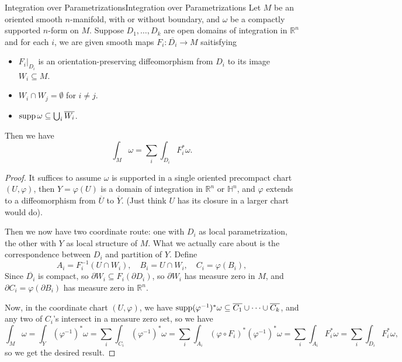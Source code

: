 \documentclass[../main.tex]{subfiles}
\begin{document}
\begin{proposition}{Integration over Parametrizations}{Integration over Parametrizations}
  Let $M$ be an oriented smooth $n$-manifold, with or without boundary, and $\omega$ be a compactly supported $n$-form on $M$. Suppose $D_1, \ldots ,D_k$ are open domains of integration in $\mathbb{R}^n$ and for each $i$, we are given smooth maps $F_i: \overline{D_i} \to M$ saitisfying
  \begin{itemize}
    \item $F_i|_{D_i}$ is an orientation-preserving diffeomorphism from $D_i$ to its image $W_i \subseteq M$.
    \item $W_i \cap W_j = \emptyset$ for $i\neq j$.
    \item $\operatorname{supp} \omega \subseteq \bigcup_i \overline{W_i}$.
  \end{itemize}
  Then we have
  \begin{equation}
    \int_M \omega = \sum_i \int_{D_i} F_i^*\omega.
  \end{equation}
\end{proposition}
\begin{proof}
  It suffices to assume $\omega$ is supported in a single oriented precompact chart $(U,\varphi)$, then $Y = \varphi(U)$ is a domain of integration in $\mathbb{R}^n$ or $\mathbb{H}^n$, and $\varphi$ extends to a diffeomorphism from $\overline{U}$ to $\overline{Y}$. (Just think $U$ has its closure in a larger chart would do).
  
  Then we now have two coordinate route: one with $D_i$ as local parametrization, the other with $Y$ as local structure of $M$. What we actually care about is the correspondence between $D_i$ and partition of $Y$. Define
  \begin{equation*}
    A_i = F_i^{-1}(U \cap W_i), \quad B_i = U \cap W_i, \quad C_i = \varphi(B_i),
  \end{equation*}
  Since $\overline{D_i}$ is compact, so $\partial W_i \subseteq F_i(\partial D_i)$, so $\partial W_i$ has measure zero in $M$, and $\partial C_i = \varphi(\partial B_i)$ has measure zero in $\mathbb{R}^n$.

  Now, in the coordinate chart $(U,\varphi)$, we have $\operatorname{supp} (\varphi^{-1})^*\omega \subseteq \overline{C_1} \cup \cdots \cup \overline{C_k}$, and any two of $C_i$'s intersect in a measure zero set, so we have
  \begin{equation*}
    \int_M \omega = \int_Y (\varphi^{-1})^*\omega = \sum_i \int_{C_i} (\varphi^{-1})^*\omega = \sum_i \int_{A_i} (\varphi \circ F_i)^* (\varphi^{-1})^*\omega = \sum_i \int_{A_i} F_i^*\omega = \sum_i \int_{D_i} F_i^*\omega,
  \end{equation*}
  so we get the desired result.
\end{proof}
\end{document}

